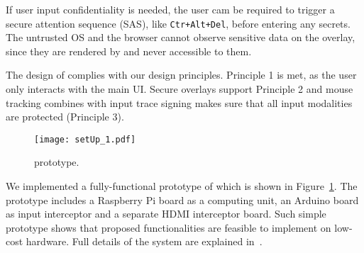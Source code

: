 If user input confidentiality is needed, the user cam be required to trigger a secure attention sequence (SAS), like \texttt{Ctr+Alt+Del}, before entering any secrets. The untrusted OS and the browser cannot observe sensitive data on the overlay, since they are rendered by \hub and never accessible to them.

The design of \protection complies with our design principles. Principle 1 is met, as the user only interacts with the main UI. Secure overlays support Principle 2 and mouse tracking combines with input trace signing makes sure that all input modalities are protected (Principle 3).

\begin{figure}[t]
	\centering
	\texttt{[image: setUp\_1.pdf]}
	\caption{\protection prototype.}
\label{fig:prototypeArch}   
\end{figure}

We implemented a fully-functional prototype of \protection which is shown in Figure~\ref{fig:prototypeArch}. The prototype includes a Raspberry Pi board as a computing unit, an Arduino board as input interceptor and a separate HDMI interceptor board. Such simple prototype shows that proposed functionalities are feasible to implement on low-cost hardware. Full details of the \protection system are explained in~\cite{protection}.






